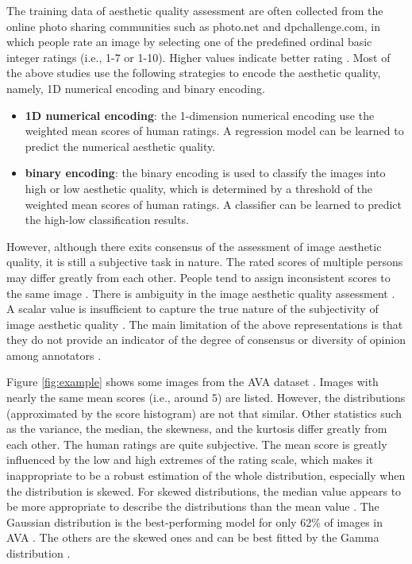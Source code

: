 \documentclass[letterpaper]{article} %
\begin{document}
The training data of aesthetic quality assessment are often collected from the online photo sharing communities such as photo.net and dpchallenge.com, in which people rate an image by selecting one of the predefined ordinal basic integer ratings (i.e., 1-7 or 1-10). Higher values indicate better rating \cite{WuICCV2011}. Most of the above studies use the following strategies to encode the aesthetic quality, namely, 1D numerical encoding and binary encoding.

\begin{itemize}

\item \textbf{1D numerical encoding}: the 1-dimension numerical encoding use the weighted mean scores of human ratings. A regression model can be learned to predict the numerical aesthetic quality.

\item  \textbf{binary encoding}: the binary encoding is used to classify the images into high or low aesthetic quality, which is determined by a threshold of the weighted mean scores of human ratings. A classifier can be learned to predict the high-low classification results.



\end{itemize}



However, although there exits consensus of the assessment of image aesthetic quality, it is still a subjective task in nature. The rated scores of multiple persons may differ greatly from each other. People tend to assign inconsistent scores to the same image \cite{WuICIP2010}. There is ambiguity in the image aesthetic quality assessment \cite{KeCVPR2006}. A scalar value is insufficient to capture the true nature of the subjectivity of image aesthetic quality \cite{WuICCV2011}. The main limitation of the above representations is that they do not provide an indicator of the degree of consensus or diversity of opinion among annotators \cite{MurrayCVPR2012}.




Figure \ref{fig:example} shows some images from the AVA dataset \cite{MurrayCVPR2012}. Images with nearly the same mean scores (i.e., around 5) are listed. However, the distributions (approximated by the score histogram) are not that similar. Other statistics such as the variance, the median, the skewness, and the kurtosis differ greatly from each other. The human ratings are quite subjective. The mean score is greatly influenced by the low and high extremes of the rating scale, which makes it inappropriate to be a robust estimation of the whole distribution, especially when the distribution is skewed. For skewed distributions, the median value appears to be more appropriate to describe the distributions than the mean value \cite{WuICCV2011}. The Gaussian distribution is the best-performing model for only 62\% of images in AVA \cite{MurrayCVPR2012}. The others are the skewed ones and can be best fitted by the Gamma distribution \cite{MurrayCVPR2012}.
\end{document}
